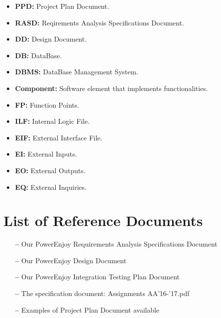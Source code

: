 \begin{itemize}
\item \textbf{PPD:} Project Plan Document.
\item \textbf{RASD:} Reqirements Analysis Specifications Document.
\item \textbf{DD:} Design Document.
\item \textbf{DB:} DataBase.
\item \textbf{DBMS:} DataBase Management System.
\item \textbf{Component:} Software element that implements functionalities.
\item \textbf{FP:} Function Points.
\item \textbf{ILF:} Internal Logic File.
\item \textbf{EIF:} External Interface File.
\item \textbf{EI:} External Inputs.
\item \textbf{EO:} External Outputs.
\item \textbf{EQ:} External Inquiries.

\end{itemize}

\section{List of Reference Documents}

\begin{itemize}
\item[\textbf{--}] Our PowerEnjoy Requirements Analysis Specifications Document
\item[\textbf{--}] Our PowerEnjoy Design Document
\item[\textbf{--}] Our PowerEnjoy Integration Testing Plan Document
\item[\textbf{--}] The specification document: Assignments AA'16-'17.pdf
\item[\textbf{--}] Examples of Project Plan Document available
\end{itemize}